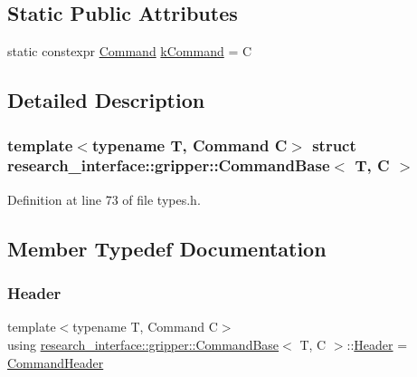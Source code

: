 \subsection*{Static Public Attributes}
\begin{DoxyCompactItemize}
\item 
static constexpr \hyperlink{namespaceresearch__interface_1_1gripper_adeda0327764e059bac8a5f967ce41590}{Command} \hyperlink{structresearch__interface_1_1gripper_1_1CommandBase_a010ab31c807dd0b5da5c6e5eb97b24c6}{k\+Command} = C
\end{DoxyCompactItemize}


\subsection{Detailed Description}
\subsubsection*{template$<$typename T, Command C$>$\newline
struct research\+\_\+interface\+::gripper\+::\+Command\+Base$<$ T, C $>$}



Definition at line 73 of file types.\+h.



\subsection{Member Typedef Documentation}
\mbox{\label{structresearch__interface_1_1gripper_1_1CommandBase_af98836db765ae091d4a49d2bda46a288}} 
\subsubsection{\texorpdfstring{Header}{Header}}
{\footnotesize\ttfamily template$<$typename T, Command C$>$ \\
using \hyperlink{structresearch__interface_1_1gripper_1_1CommandBase}{research\+\_\+interface\+::gripper\+::\+Command\+Base}$<$ T, C $>$\+::\hyperlink{structresearch__interface_1_1gripper_1_1CommandBase_af98836db765ae091d4a49d2bda46a288}{Header} =  \hyperlink{structresearch__interface_1_1gripper_1_1CommandHeader}{Command\+Header}}



